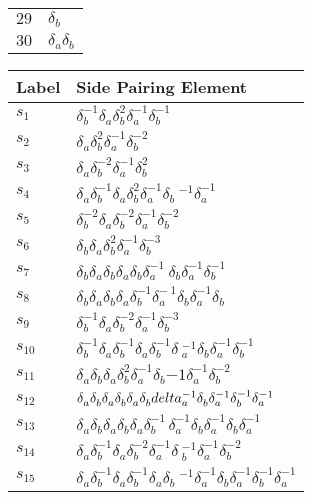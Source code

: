 \documentclass{article}
\begin{document}
\begin{center}
\begin{tabular}{ll}
$29$ & $\delta_b^{}$ \\
$30$ & $\delta_a^{}\delta_b^{}$ \\
\bottomrule
\end{tabular}
\hfill
\begin{tabular}{ll}
\toprule
Label & Side Pairing Element\\
\midrule
$s_{1}$ & $\delta_b^{-1}\delta_a^{}\delta_b^{2}\delta_a^{-1}\delta_b^{-1}$ \\
$s_{2}$ & $\delta_a^{}\delta_b^{2}\delta_a^{-1}\delta_b^{-2}$ \\
$s_{3}$ & $\delta_a^{}\delta_b^{-2}\delta_a^{-1}\delta_b^{2}$ \\
$s_{4}$ & $\delta_a^{}\delta_b^{-1}\delta_a^{}\delta_b^{2}\delta_a^{-1}\delta_b\
^{-1}\delta_a^{-1}$ \\
$s_{5}$ & $\delta_b^{-2}\delta_a^{}\delta_b^{-2}\delta_a^{-1}\delta_b^{-2}$ \\
$s_{6}$ & $\delta_b^{}\delta_a^{}\delta_b^{2}\delta_a^{-1}\delta_b^{-3}$ \\
$s_{7}$ & $\delta_b^{}\delta_a^{}\delta_b^{}\delta_a^{}\delta_b^{}\delta_a^{-1}\
\delta_b^{}\delta_a^{-1}\delta_b^{-1}$ \\
$s_{8}$ & $\delta_b^{}\delta_a^{}\delta_b^{}\delta_a^{}\delta_b^{-1}\delta_a^{-\
1}\delta_b^{}\delta_a^{-1}\delta_b^{}$ \\
$s_{9}$ & $\delta_b^{-1}\delta_a^{}\delta_b^{-2}\delta_a^{-1}\delta_b^{-3}$ \\
$s_{10}$ & $\delta_b^{-1}\delta_a^{}\delta_b^{-1}\delta_a^{}\delta_b^{-1}\delta\
_a^{-1}\delta_b^{}\delta_a^{-1}\delta_b^{-1}$ \\
$s_{11}$ & $\delta_a^{}\delta_b^{}\delta_a^{}\delta_b^{2}\delta_a^{-1}\delta_b^\
{-1}\delta_a^{-1}\delta_b^{-2}$ \\
$s_{12}$ & $\delta_a^{}\delta_b^{}\delta_a^{}\delta_b^{}\delta_a^{}\delta_b^{}\\
delta_a^{-1}\delta_b^{}\delta_a^{-1}\delta_b^{-1}\delta_a^{-1}$ \\
$s_{13}$ & $\delta_a^{}\delta_b^{}\delta_a^{}\delta_b^{}\delta_a^{}\delta_b^{-1\
}\delta_a^{-1}\delta_b^{}\delta_a^{-1}\delta_b^{}\delta_a^{-1}$ \\
$s_{14}$ & $\delta_a^{}\delta_b^{-1}\delta_a^{}\delta_b^{-2}\delta_a^{-1}\delta\
_b^{-1}\delta_a^{-1}\delta_b^{-2}$ \\
$s_{15}$ & $\delta_a^{}\delta_b^{-1}\delta_a^{}\delta_b^{-1}\delta_a^{}\delta_b\
^{-1}\delta_a^{-1}\delta_b^{}\delta_a^{-1}\delta_b^{-1}\delta_a^{-1}$ \\
\bottomrule
\end{tabular}
\end{center}

\thispagestyle{empty}
\end{document}
